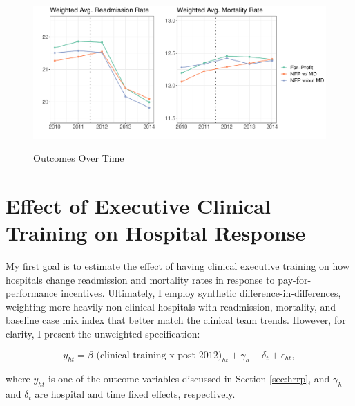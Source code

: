 \documentclass[12pt]{article}
\begin{document}
    \begin{figure}[ht!]
    \centering
        \caption{Outcomes Over Time}
        \includegraphics[width=\textwidth]{Objects/weighted_read_mort_adjusted_graph.pdf}
        \label{fig:weighted_read_mort_graph}
    \end{figure}


    \section{Effect of Executive Clinical Training on Hospital Response}\label{sec:clinical}

    My first goal is to estimate the effect of having clinical executive training on how hospitals change readmission and mortality rates in response to pay-for-performance incentives. Ultimately, I employ synthetic difference-in-differences, weighting more heavily non-clinical hospitals with readmission, mortality, and baseline case mix index that better match the clinical team trends. However, for clarity, I present the unweighted specification:

    \begin{equation}
    \label{eq:clinical}
    y_{ht} = \beta \text{ (clinical training x post 2012)}_{ht} + \gamma_{h} + \delta_t + \epsilon_{ht},
    \end{equation}
    

    \noindent where $y_{ht}$ is one of the outcome variables discussed in Section \ref{sec:hrrp}, and $\gamma_h$ and $\delta_t$ are hospital and time fixed effects, respectively. 
\end{document}
